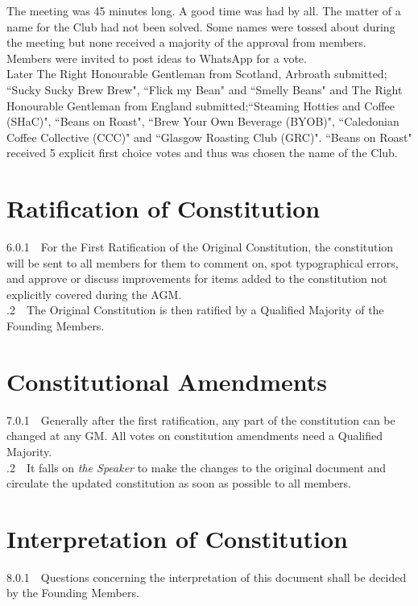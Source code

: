 \documentclass[a4paper,11pt]{article}
\begin{document}
\noindent The meeting was 45 minutes long. A good time was had by all. The matter of a name for the Club had not been solved. Some names were tossed about during the meeting but none received a majority of the approval from members. Members were invited to post ideas to WhatsApp for a vote.\\ 

\noindent Later The Right Honourable Gentleman from Scotland, Arbroath submitted; ``Sucky Sucky Brew Brew", ``Flick my Bean" and ``Smelly Beans" and The Right Honourable Gentleman from England submitted;``Steaming Hotties and Coffee (SHaC)", ``Beans on Roast", ``Brew Your Own Beverage (BYOB)", ``Caledonian Coffee Collective (CCC)" and ``Glasgow Roasting Club (GRC)". ``Beans on Roast" received 5 explicit first choice votes and thus was chosen the name of the Club.

\section{Ratification of Constitution}
6.0.1$\quad$For the First Ratification of the Original Constitution, the constitution will be sent to all members for them to comment on, spot typographical errors, and approve or discuss improvements for items added to the constitution not explicitly covered during the AGM.\\ 

.2$\quad$The Original Constitution is then ratified by a Qualified Majority of the Founding Members. 
   
\section{Constitutional Amendments}
7.0.1$\quad$Generally after the first ratification, any part of the constitution can be changed at any GM. All votes on constitution amendments need a Qualified Majority.\\

.2$\quad$It falls on \textit{the Speaker} to make the changes to the original document and circulate the updated constitution as soon as possible to all members. 

\section{Interpretation of Constitution}
8.0.1$\quad$Questions concerning the interpretation of this document shall be decided by the Founding Members.
\end{document}
